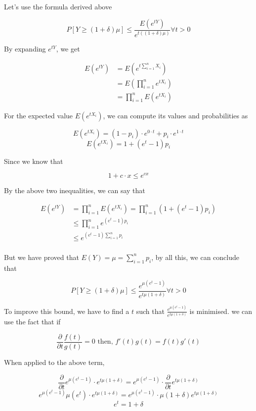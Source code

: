 \documentclass[openany]{book}
\begin{document}
	Let's use the formula derived above 
	
	\[ P[Y \geq (1 + \delta) \mu] \leq \frac{E(e^{tY})}{e^{t((1 + \delta) \mu)}} \forall t>0 \]
	
	By expanding $e^{tY}$, we get 
	
	\begin{align*}
		E(e^{tY}) &= E\left(e^{t \sum_{i=1}^{n} X_i }\right) \\
		&= E\left( \prod_{i=1}^{n} e^{t X_i} \right) \\
		&= \prod_{i=1}^{n} E(e^{t X_i})
	\end{align*}
	
	For the expected value $E(e^{t X_i})$, we can compute its values and probabilities as 
	
	\[ E(e^{t X_i}) = (1 - p_i) \cdot e^{0 \cdot t}  + p_i \cdot e^{1 \cdot t} \]
	\[ E(e^{t X_i}) = 1 + (e^t - 1)p_i \]
	
	Since we know that 
	
	\[ 1 + c \cdot x \leq e^{cx} \]
	
	By the above two inequalities, we can say that 
	
	\begin{align*}
		E(e^{tY}) &= \prod_{i=1}^{n} E(e^{t X_i}) = \prod_{i=1}^{n} (1 + (e^t - 1)p_i) \\
		&\leq \prod_{i=1}^{n} e ^ {(e^t-1) p_i} \\
		&\leq e ^ {(e^t-1) \sum_{i=1}^{n} p_i} \\
	\end{align*}
	
	But we have proved that $ E(Y) = \mu = \sum_{i=1}^{n} p_i $, by all this, we can conclude that 
	
	\[ \boxed{ P[Y \geq (1 + \delta) \mu] \leq \frac{e ^ {\mu (e^t-1)}}{e^{t \mu (1 + \delta)}} \forall t>0}\]
	
	To improve this bound, we have to find a $t$ such that $\frac{e ^ {\mu (e^t-1)}}{e^{t \mu (1 + \delta)}}$ is 
	minimised. we can use the fact that if
	
	\[ \frac{\partial}{\partial t} \frac{f(t)}{g(t)} = 0 \text{ then, } f'(t)g(t) = f(t)g'(t)\]
	
	When applied to the above term, 
	
	\[ \frac{\partial}{\partial t} e ^ {\mu (e^t-1)} \cdot e^{t \mu (1 + \delta)} = e ^ {\mu (e^t-1)} \cdot \frac{\partial}{\partial t} e^{t \mu (1 + \delta)} \]
	\[ e ^ {\mu (e^t-1)} \mu (e^t) \cdot e^{t \mu (1 + \delta)} =  e ^ {\mu (e^t-1)} \cdot \mu (1+\delta) e^{t \mu (1 + \delta)}\]
	\[ e^t = 1 + \delta \]
	
\end{document}
